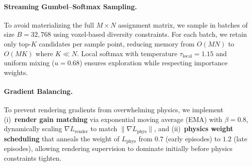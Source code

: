 \paragraph{Streaming Gumbel--Softmax Sampling.}
    To avoid materializing the full $M{\times}N$ assignment matrix, we sample in batches of size $B=32{,}768$ using voxel-based diversity constraints. For each batch, we retain only top-$K$ candidates per sample point, reducing memory from $O(MN)$ to $O(MK)$ where $K{\ll}N$. Local softmax with temperature $\tau_{\text{local}}=1.15$ and uniform mixing ($u=0.68$) ensures exploration while respecting importance weights.

\paragraph{Gradient Balancing.}
    To prevent rendering gradients from overwhelming physics, we implement (i)~\textbf{render gain matching} via exponential moving average (EMA) with $\beta=0.8$, dynamically scaling $\nabla L_{\text{render}}$ to match $\|\nabla L_{\text{phys}}\|$, and (ii)~\textbf{physics weight scheduling} that anneals the weight of $L_{\text{phys}}$ from $0.7$ (early episodes) to $1.2$ (late episodes), allowing rendering supervision to dominate initially before physics constraints tighten.

